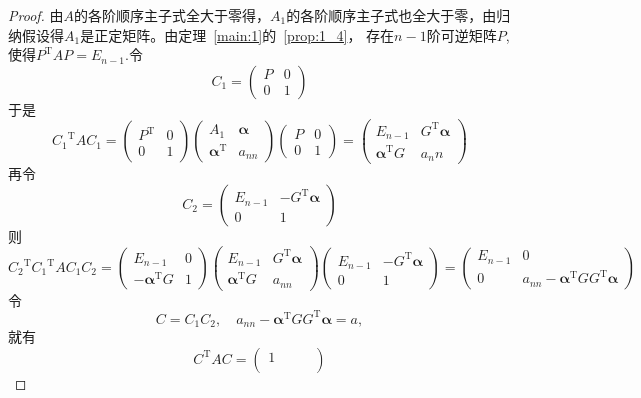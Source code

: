 \begin{proof}
    由$A$的各阶顺序主子式全大于零得，$A_1$的各阶顺序主子式也全大于零，由归纳假设得$A_1$是正定矩阵。由定理~\ref{main:1}的~\ref{prop:1_4}，
存在$n-1$阶可逆矩阵$P$,使得$P^\mathrm{T}AP=E_{n-1}$.令\[C_1=
\begin{pmatrix}
    P & 0\\
    0 & 1
\end{pmatrix}\]
于是\[{C_1}^\mathrm{T}A{C_1}=
\begin{pmatrix}
    P^\mathrm{T} & 0\\
    0 & 1
\end{pmatrix}
\begin{pmatrix}
    A_1 & \boldsymbol{\alpha}\\
    \boldsymbol{\alpha}^\mathrm{T} & a_{nn}
\end{pmatrix}
\begin{pmatrix}
    P & 0\\
    0 & 1
\end{pmatrix}=
\begin{pmatrix}
    E_{n-1} & G^\mathrm{T}\boldsymbol{\alpha}\\
    \boldsymbol{\alpha}^\mathrm{T}G & a_nn
\end{pmatrix}\]
再令\[C_2=
\begin{pmatrix}
    E_{n-1} & -G^\mathrm{T}\boldsymbol{\alpha}\\
    0 & 1
\end{pmatrix}\]
则\[{C_2}^\mathrm{T}{C_1}^\mathrm{T}A{C_1}{C_2}=
\begin{pmatrix}
    E_{n-1} & 0\\
    -\boldsymbol{\alpha}^\mathrm{T} G & 1
\end{pmatrix}
\begin{pmatrix}
   E_{n-1} & G^\mathrm{T}\boldsymbol{\alpha}\\
   \boldsymbol{\alpha}^\mathrm{T}G & a_{nn}
\end{pmatrix}
\begin{pmatrix}
    E_{n-1} & -G^\mathrm{T}\boldsymbol{\alpha}\\
    0 & 1
\end{pmatrix}=
\begin{pmatrix}
    E_{n-1} & 0\\
    0 & a_{nn}-\boldsymbol{\alpha}^\mathrm{T}GG^\mathrm{T}\boldsymbol{\alpha}
\end{pmatrix}\]
令\[
C = C_1 C_2,\quad a_{nn} - \boldsymbol{\alpha}^\mathrm{T} G G^\mathrm{T} \boldsymbol{\alpha} = a,
\]
就有
\[
C^\mathrm{T} A C = 
\begin{pmatrix}
1 & & & \\

\end{pmatrix}\]
\end{proof}
